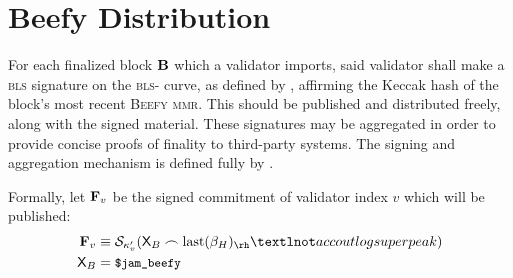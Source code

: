 \section{Beefy Distribution}\label{sec:beefy}

For each finalized block $\mathbf{B}$ which a validator imports, said validator shall make a \textsc{bls} signature on the \textsc{bls}- curve, as defined by \cite{bls12-381}, affirming the Keccak hash of the block's most recent \textsc{Beefy} \textsc{mmr}. This should be published and distributed freely, along with the signed material. These signatures may be aggregated in order to provide concise proofs of finality to third-party systems. The signing and aggregation mechanism is defined fully by \cite{cryptoeprint:2022/1611}.

Formally, let $\mathbf{F}_{v}$ be the signed commitment of validator index $v$ which will be published:
\begin{align}\label{eq:beefysignedcommitment}
  \beefycommitment{v} &\equiv \signdata{\activeset'\sub{v}}{\mathsf{X}_B \concat \text{last}(\recenthistory)_\rh¬accoutlogsuperpeak}\\
  \mathsf{X}_B &= \token{\$jam\_beefy}
\end{align}
